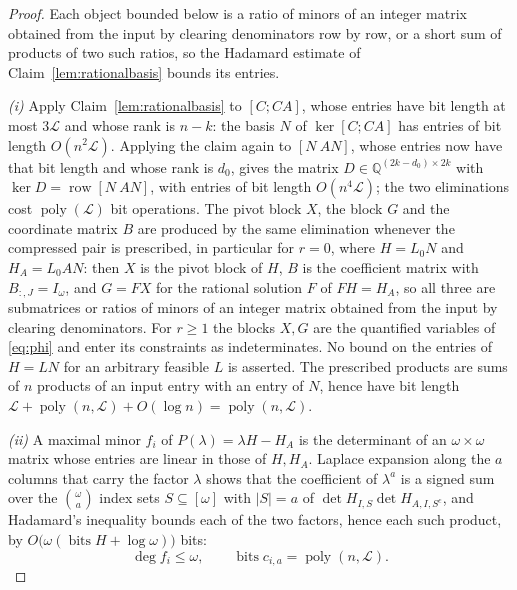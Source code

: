 \documentclass[journal]{IEEEtran}
\theoremstyle{plainn}
\theoremstyle{remark}
\begin{document}
\begin{proof}
Each object bounded below is a ratio of minors of an integer matrix obtained from the input by clearing
denominators row by row, or a short sum of products of two such ratios, so the Hadamard estimate of
Claim~\ref{lem:rationalbasis} bounds its entries.

\emph{(i)} Apply Claim~\ref{lem:rationalbasis} to $[C;CA]$, whose entries have bit length at most
$3\mathcal L$ and whose rank is $n-k$: the basis $N$ of $\ker[C;CA]$ has entries of bit length
$O(n^2\mathcal L)$. Applying the claim again to $[N\ AN]$, whose entries now have that bit length and
whose rank is $d_0$, gives the matrix $D\in\mathbb Q^{(2k-d_0)\times2k}$ with
$\ker D=\operatorname{row}[N\ AN]$, with entries of bit length $O(n^4\mathcal L)$; the two
eliminations cost $\operatorname{poly}(\mathcal L)$ bit operations.
The pivot block $X$, the block $G$ and the coordinate matrix $B$ are produced by the same
elimination whenever the compressed pair is prescribed, in particular for $r=0$, where $H=L_0N$ and
$H_A=L_0AN$: then $X$ is the pivot block of $H$, $B$ is the coefficient matrix with
$B_{:,J}=I_\omega$, and $G=FX$ for the rational solution $F$ of $FH=H_A$, so all three are
submatrices or ratios of minors of an integer matrix obtained from the input by clearing denominators. For $r\ge1$ the blocks
$X,G$ are the quantified variables of \eqref{eq:phi} and enter its constraints as indeterminates. No bound on
the entries of $H=LN$ for an arbitrary feasible $L$ is asserted. The
prescribed products are sums of $n$ products of an input entry with an entry of $N$, hence have bit
length $\mathcal L+\operatorname{poly}(n,\mathcal L)+O(\log n)=\operatorname{poly}(n,\mathcal L)$.

\emph{(ii)} A maximal minor $f_i$ of $P(\lambda)=\lambda H-H_A$ is the determinant
of an $\omega\times\omega$ matrix whose entries are linear in those of $H,H_A$.
Laplace expansion along the $a$ columns that carry the factor $\lambda$ shows that the coefficient
of $\lambda^a$ is a signed sum over the $\binom{\omega}{a}$ index sets $S\subseteq[\omega]$ with
$|S|=a$ of $\det H_{I,S}\det H_{A,I,S^{c}}$, and Hadamard's inequality bounds each of the two
factors, hence each such product, by $O\bigl(\omega(\operatorname{bits}H+\log\omega)\bigr)$ bits:
\begin{equation*}
\deg f_i\le\omega,\qquad
\operatorname{bits}c_{i,a}=\operatorname{poly}(n,\mathcal L).
\end{equation*}


\end{proof}
\end{document}

